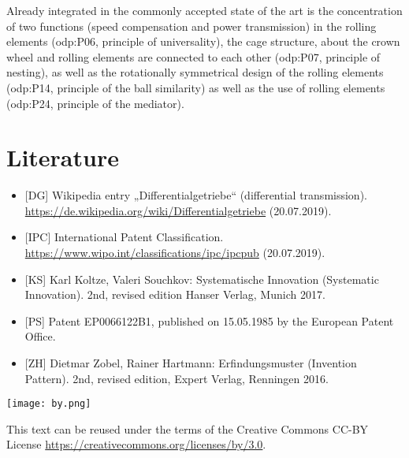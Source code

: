 \documentclass[11pt,a4paper]{article}
\newcommand{\ccnotice}{\vfill
  \begin{minipage}{.22\textwidth}\centering
    \texttt{[image: by.png]}
  \end{minipage}\hfill\begin{minipage}{.77\textwidth}
  This text can be reused under the terms of the Creative Commons CC-BY
  License \url{https://creativecommons.org/licenses/by/3.0}.
  \end{minipage}
}
\begin{document}
Already integrated in the commonly accepted state of the art is the
concentration of two functions (speed compensation and power transmission) in
the rolling elements (odp:P06, principle of universality), the cage structure,
about the crown wheel and rolling elements are connected to each other
(odp:P07, principle of nesting), as well as the rotationally symmetrical
design of the rolling elements (odp:P14, principle of the ball similarity) as
well as the use of rolling elements (odp:P24, principle of the mediator).

\section{Literature}
\raggedright
\begin{itemize}
\item{[DG]} Wikipedia entry „Differentialgetriebe“ (differential
  transmission).  \url{https://de.wikipedia.org/wiki/Differentialgetriebe}
  (20.07.2019).
\item{[IPC]} International Patent Classification.
  \url{https://www.wipo.int/classifications/ipc/ipcpub} (20.07.2019).
\item{[KS]} Karl Koltze, Valeri Souchkov: Systematische Innovation (Systematic
  Innovation). 2nd, revised edition Hanser Verlag, Munich 2017.
\item{[PS]} Patent EP0066122B1, published on 15.05.1985 by the
  European Patent Office.
\item{[ZH]} Dietmar Zobel, Rainer Hartmann: Erfindungsmuster (Invention
  Pattern). 2nd, revised edition, Expert Verlag, Renningen 2016.
\end{itemize}

\vfill
\ccnotice
\end{document}
